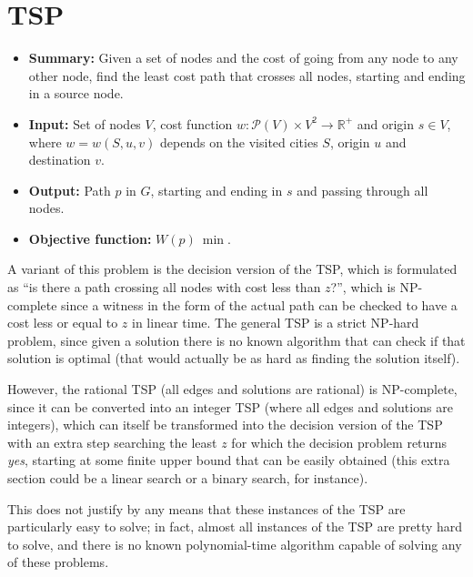\section{\texorpdfstring{\Acrlong*{TSP}}{Travelling salesman problem}} \label{algorithm-tsp}
\begin{itemize}
    \item \textbf{Summary:} Given a set of nodes and the cost of going from any node to any other node, find the least cost path that crosses all nodes, starting and ending in a source node. 
    \item \textbf{Input:} Set of nodes $V$, cost function $w: \mathscr{P}(V) \times V^2 \rightarrow \mathbb{R}^+$ and origin $s \in V$, where $w=w(S, u, v)$ depends on the visited cities $S$, origin $u$ and destination $v$.
    \item \textbf{Output:} Path $p$ in $G$, starting and ending in $s$ and passing through all nodes.
    \item \textbf{Objective function:} $W(p)~\min$.
\end{itemize}
A variant of this problem is the decision version of the \acrshort*{TSP}, which is formulated as ``is there a path crossing all nodes with cost less than $z$?'', which is NP-complete since a witness in the form of the actual path can be checked to have a cost less or equal to $z$ in linear time.
The general \acrshort*{TSP} is a strict NP-hard problem, since given a solution there is no known algorithm that can check if that solution is optimal (that would actually be as hard as finding the solution itself).\par
However, the rational \acrshort*{TSP} (all edges and solutions are rational) is NP-complete, since it can be converted into an integer \acrshort*{TSP} (where all edges and solutions are integers), which can itself be transformed into the decision version of the \acrshort*{TSP} with an extra step searching the least $z$ for which the decision problem returns \emph{yes}, starting at some finite upper bound that can be easily obtained (this extra section could be a linear search or a binary search, for instance).\par
This does not justify by any means that these instances of the \acrshort*{TSP} are particularly easy to solve; in fact, almost all instances of the \acrshort*{TSP} are pretty hard to solve, and there is no known polynomial-time algorithm capable of solving any of these problems.


